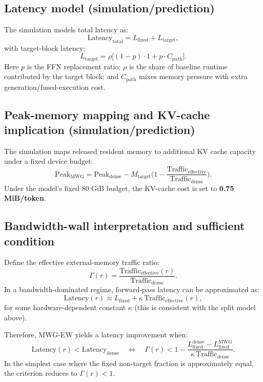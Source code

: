 \documentclass[11pt]{article}
\begin{document}
\subsection{Latency model (simulation/prediction)}
The simulation models total latency as:
\begin{equation}
\text{Latency}_{\text{total}} = L_{\text{fixed}} + L_{\text{target}},
\end{equation}
with target-block latency:
\begin{equation}
L_{\text{target}} = \rho\Big[(1-p)\cdot 1 + p\cdot C_{\text{path}}\Big].
\end{equation}
Here $p$ is the FFN replacement ratio; $\rho$ is the share of baseline runtime contributed by the target block; and $C_{\text{path}}$ mixes memory pressure with extra generation/fused-execution cost.

\subsection{Peak-memory mapping and KV-cache implication (simulation/prediction)}
The simulation maps released resident memory to additional KV cache capacity under a fixed device budget:
\begin{equation}
\text{Peak}_{\text{MWG}} = \text{Peak}_{\text{dense}} - M_{\text{target}}\Big(1-\frac{\text{Traffic}_{\text{effective}}}{\text{Traffic}_{\text{dense}}}\Big).
\end{equation}
Under the model’s fixed 80 GiB budget, the KV-cache cost is set to \textbf{0.75 MiB/token}.

\subsection{Bandwidth-wall interpretation and sufficient condition}
Define the effective external-memory traffic ratio:
\begin{equation}
\Gamma(r) = \frac{\text{Traffic}_{\text{effective}}(r)}{\text{Traffic}_{\text{dense}}}.
\end{equation}
In a bandwidth-dominated regime, forward-pass latency can be approximated as:
\begin{equation}
\text{Latency}(r) \approx L_{\text{fixed}} + \kappa\,\text{Traffic}_{\text{effective}}(r),
\end{equation}
for some hardware-dependent constant $\kappa$ (this is consistent with the split model above).

Therefore, MWG-EW yields a latency improvement when:
\begin{equation}
\text{Latency}(r) < \text{Latency}_{\text{dense}}
\quad\Longleftrightarrow\quad
\Gamma(r) < 1 - \frac{L_{\text{fixed}}^{\text{dense}}-L_{\text{fixed}}^{\text{MWG}}}{\kappa\,\text{Traffic}_{\text{dense}}}.
\end{equation}
In the simplest case where the fixed non-target fraction is approximately equal, the criterion reduces to $\Gamma(r)<1$.
\end{document}
